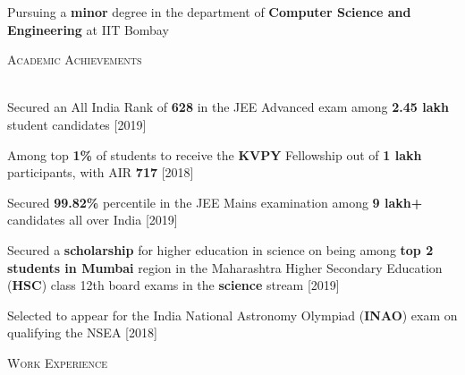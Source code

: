 \documentclass[11pt]{article}
\renewcommand{\section}[1]{
    \vspace*{8pt}
    \textsc{\LARGE{#1}}
    \vspace*{-10pt} \\ \hspace*{-5pt} 
    \hrulefill \\
    \vspace*{-15pt}
    \vspace*{-8pt}
}
\newcommand{\smallbullet}{
    \small$\bullet$
}
\newenvironment{bullet-list-major}{
    \vspace*{8pt}
    \begin{list}{
        \smallbullet
    }{
        \setlength\leftmargin{15pt}\topsep -5pt \itemsep -6pt
    }
} {
    \end{list}
}
\begin{document}
    \vspace*{48.63mm}



    \vspace{-20pt}
    Pursuing a \textbf{minor} degree in the department of \textbf{Computer Science and Engineering} at IIT Bombay
    \vspace{-10pt}

    \section{Academic Achievements}
    \begin{bullet-list-major}
        \item Secured an All India Rank of \textbf{628} in the JEE Advanced exam among \textbf{2.45 lakh} student candidates \hfill [2019]
        \item Among top \textbf{1\%} of students to receive the \textbf{KVPY} Fellowship out of \textbf{1 lakh} participants, with AIR \textbf{717}  \hfill [2018]
        \item Secured \textbf{99.82\%} percentile in the JEE Mains examination among \textbf{9 lakh+} candidates all over India \hfill [2019]
        \item Secured a \textbf{scholarship} for higher education in science on being among \textbf{top 2 students in Mumbai} region in the Maharashtra Higher Secondary Education (\textbf{HSC}) class 12th board exams in the \textbf{science} stream   \hfill [2019]
        \item Selected to appear for the India National Astronomy Olympiad (\textbf{INAO}) exam on qualifying the NSEA \hfill [2018]
    \end{bullet-list-major}


    \section{Work Experience}
\end{document}
